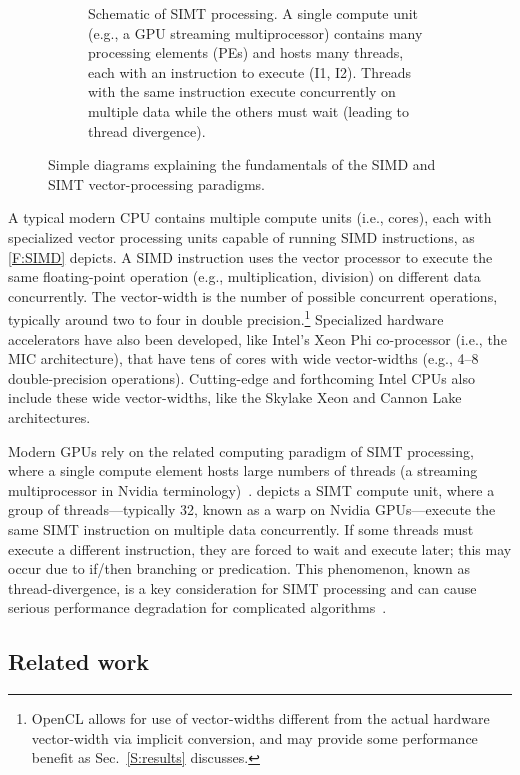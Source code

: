 \documentclass[12pt,number,sort&compress,preprint]{elsarticle}
\newcommand{\revise}[1]{{\sloppy\textcolor{RoyalPurple}{#1}}}  %
\begin{document}
\begin{figure}[htb]
\begin{subfigure}[t]{0.45\linewidth}
      \caption{Schematic of SIMT processing. A single compute unit (e.g., a GPU streaming multiprocessor) contains many processing elements (PEs) and hosts many threads, each with an instruction to execute (I1, I2).  Threads with the same instruction execute concurrently on multiple data while the others must wait (leading to thread divergence).}
      \label{F:SIMT}
  \end{subfigure}
  \caption{Simple diagrams explaining the fundamentals of the SIMD and SIMT vector-processing paradigms.}
\end{figure}

A typical modern CPU \revise{contains multiple} compute units (i.e., cores), each with specialized vector processing units capable of running SIMD instructions, \revise{as \cref{F:SIMD} depicts}.
A SIMD instruction uses the vector processor to execute the same floating-point operation (e.g., multiplication, division) \revise{on different data} concurrently.
\revise{The vector-width is the number of possible concurrent operations, typically around two to four in double precision.}\footnote{OpenCL allows for use of vector-widths different from the actual hardware vector-width via implicit conversion, and may provide some performance benefit as Sec.~\ref{S:results} \revise{discusses.}}
Specialized hardware accelerators \revise{have also been developed, like Intel's Xeon Phi co-processor (i.e., the MIC architecture)}, that have tens of cores with wide vector-widths (e.g., \numrange{4}{8} double-precision operations).
\revise{Cutting-edge and forthcoming Intel CPUs also include these wide vector-widths, like the Skylake Xeon and Cannon Lake architectures.}

\revise{Modern GPUs rely on the related computing paradigm of SIMT processing, where a single compute element hosts large
numbers of threads (a streaming multiprocessor in Nvidia terminology)~\cite{lindholm2008Nvidia}.}
\revise{ depicts a SIMT compute unit, where a group of threads---typically \num{32}, known as a warp on Nvidia GPUs---execute the same SIMT instruction on multiple data concurrently}.
If some threads must execute a different instruction, they are forced to wait and execute later; \revise{this may occur due to if\slash then branching or predication.}
This phenomenon, known as thread-divergence, is a key consideration for SIMT processing and can cause serious performance degradation for complicated algorithms~\cite{CurtisGPU:2017}.

\subsection{Related work}
\label{S:related}
\end{document}
